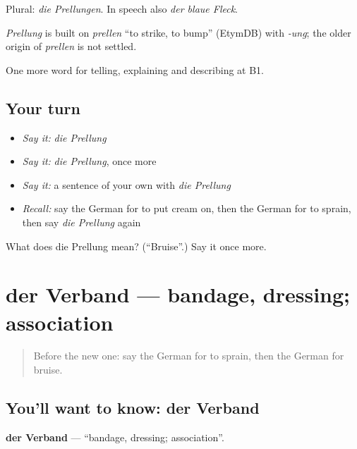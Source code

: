 Plural: \emph{die Prellungen}. In speech also \emph{der blaue Fleck}.

\begin{cousinweb}
\emph{Prellung} is built on \emph{prellen} \textquotedblleft{}to strike, to bump\textquotedblright{} (EtymDB) with \emph{-ung}; the older origin of \emph{prellen} is not settled.
\end{cousinweb}

\begin{grammarlens}[title={What you've built}]
One more word for telling, explaining and describing at B1.
\end{grammarlens}

\subsection*{Your turn}
\begin{itemize}
\raggedright
  \item \emph{Say it:} \emph{die Prellung}
  \item \emph{Say it:} \emph{die Prellung}, once more
  \item \emph{Say it:} a sentence of your own with \emph{die Prellung}
  \item \emph{Recall:} say the German for to put cream on, then the German for to sprain, then say \emph{die Prellung} again
\end{itemize}

\begin{tcolorbox}[breakable,colback=teal!4,colframe=teal!35!black,title={Before you move on}]
What does die Prellung mean? (\textquotedblleft{}Bruise\textquotedblright{}.) Say it once more.
\end{tcolorbox}
\section[der Verband]{der Verband — bandage, dressing; association}

\label{lesson:GE-C482-verband}



\begin{quote}
Before the new one: say the German for to sprain, then the German for bruise.
\end{quote}

\subsection*{You'll want to know: der Verband}
\textbf{der Verband} — \textquotedblleft{}bandage, dressing; association\textquotedblright{}.


